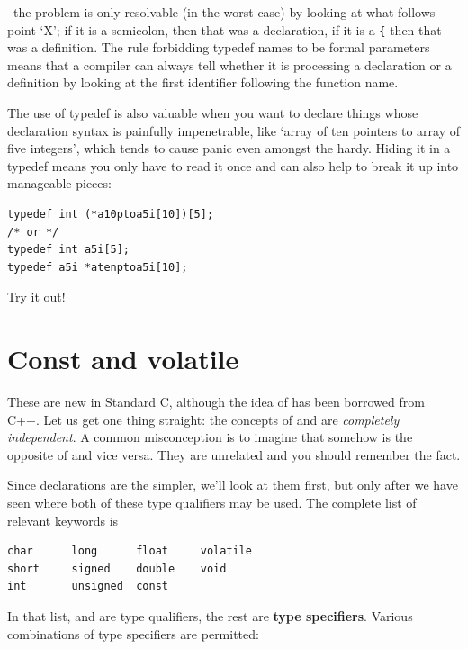   --the problem is only resolvable (in the worst case) by looking at
   what follows point `X'; if it is a semicolon, then that was
   a declaration, if it is a \texttt{\{} then that was a definition. The
   rule forbidding typedef names to be formal parameters means that
   a compiler can always tell whether it is processing a declaration or
   a definition by looking at the first identifier following the function
   name.


  The use of typedef is also valuable when you want to declare things
   whose declaration syntax is painfully impenetrable, like `array of ten
   pointers to array of five integers', which tends to cause panic even
   amongst the hardy. Hiding it in a typedef means you only have to read it
   once and can also help to break it up into manageable pieces:


\begin{Verbatim}
typedef int (*a10ptoa5i[10])[5];
/* or */
typedef int a5i[5];
typedef a5i *atenptoa5i[10];
\end{Verbatim}

  Try it out!


 
        \section{Const and volatile}
        

  

  These are new in Standard C, although the idea of \const{}
   has been borrowed from C++. Let us get one thing straight: the concepts
   of \const{} and \volatile{} are \textit{completely
   independent}. A common misconception is to imagine that somehow
   \const{} is the opposite of \volatile{} and vice
   versa. They are unrelated and you should remember the fact.


  Since \const{} declarations are the simpler, we'll look at
   them first, but only after we have seen where both of these type
   qualifiers may be used. The complete list of relevant keywords is


\begin{Verbatim}
char      long      float     volatile
short     signed    double    void
int       unsigned  const
\end{Verbatim}

  In that list, \const{} and \volatile{} are type
   qualifiers, the rest are \textbf{type specifiers}. Various combinations
   of type specifiers are permitted:


